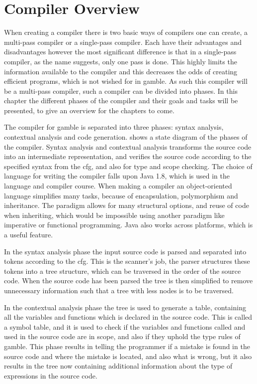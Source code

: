 \chapter{Compiler Overview}\label{Chp:CompilerOverview}
When creating a compiler there is two basic ways of compilers one can create, a multi-pass compiler or a single-pass compiler.
Each have their advantages and disadvantages however the most significant difference is that in a single-pass compiler, as the name suggests, only one pass is done.
This highly limits the information available to the compiler and this decreases the odds of creating efficient programs, which is not wished for in \gls{gamble}.
As such this compiler will be a multi-pass compiler, such a compiler can be divided into phases.
In this chapter the different phases of the compiler and their goals and tasks will be presented, to give an overview for the chapters to come.

The compiler for \gls{gamble} is separated into three phases: syntax analysis, contextual analysis and code generation.
 shows a state diagram of the phases of the compiler.
Syntax analysis and contextual analysis transforms the source code into an intermediate representation, and verifies the source code according to the specified syntax from the \acrshort{cfg}, and also for type and scope checking.
The choice of language for writing the compiler falls upon Java 1.8, which is used in the language and compiler course.
When making a compiler an object-oriented language simplifies many tasks, because of encapsulation, polymorphism and inheritance. 
The paradigm allows for many structural options, and reuse of code when inheriting, which would be impossible using another paradigm like imperative or functional programming.
Java also works across platforms, which is a useful feature.

In the syntax analysis phase the input source code is parsed and separated into tokens according to the \acrshort{cfg}.
This is the scanner's job, the parser structures these tokens into a tree structure, which can be traversed in the order of the source code.
When the source code has been parsed the tree is then simplified to remove unnecessary information such that a tree with less nodes is to be traversed.

In the contextual analysis phase the tree is used to generate a table, containing all the variables and functions which is declared in the source code.
This is called a symbol table, and it is used to check if the variables and functions called and used in the source code are in scope, and also if they uphold the type rules of \gls{gamble}.
This phase results in telling the programmer if a mistake is found in the source code and where the mistake is located, and also what is wrong, but it also results in the tree now containing additional information about the type of expressions in the source code.

